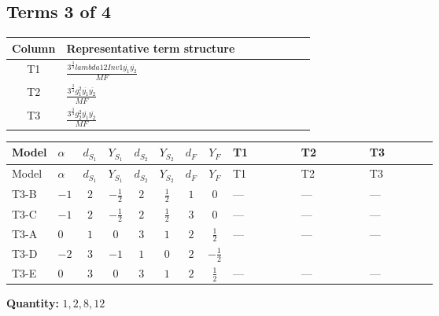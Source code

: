 \documentclass[8pt]{article}
\begin{document}
\begin{landscape}
\subsection*{Terms 3 of 4}
\begin{center}
\begin{tabular}{@{}c >{\raggedright\arraybackslash}p{0.82\linewidth}@{}}
\toprule
Column & Representative term structure \\
\midrule
T1 & \(\displaystyle \frac{3^{\frac{3}{4}} lambda12Inv1 \overline{y_{1}} \overline{y_{2}}}{MF}\) \\
\midrule
T2 & \(\displaystyle \frac{3^{\frac{3}{4}} g_{1}^{2} \overline{y_{1}} \overline{y_{2}}}{MF}\) \\
\midrule
T3 & \(\displaystyle \frac{3^{\frac{3}{4}} g_{2}^{2} \overline{y_{1}} \overline{y_{2}}}{MF}\) \\
\midrule
\bottomrule
\end{tabular}
\end{center}
\smallskip
\tiny
\begin{longtable}{@{}llcccccc >{\raggedright\arraybackslash}p{0.21\linewidth} >{\raggedright\arraybackslash}p{0.21\linewidth} >{\raggedright\arraybackslash}p{0.21\linewidth}@{}}
\toprule
Model & $\alpha$ & $d_{S_1}$ & $Y_{S_1}$ & $d_{S_2}$ & $Y_{S_2}$ & $d_F$ & $Y_F$ & T1 & T2 & T3 \\
\midrule
\endfirsthead
\toprule
Model & $\alpha$ & $d_{S_1}$ & $Y_{S_1}$ & $d_{S_2}$ & $Y_{S_2}$ & $d_F$ & $Y_F$ & T1 & T2 & T3 \\
\midrule
\endhead
T3-B & $-1$ & $2$ & $-\frac{1}{2}$ & $2$ & $\frac{1}{2}$ & $1$ & $0$ & --- & --- & --- \\
\midrule
T3-C & $-1$ & $2$ & $-\frac{1}{2}$ & $2$ & $\frac{1}{2}$ & $3$ & $0$ & --- & --- & --- \\
\midrule
T3-A & $0$ & $1$ & $0$ & $3$ & $1$ & $2$ & $\frac{1}{2}$ & --- & --- & --- \\
\midrule
T3-D & $-2$ & $3$ & $-1$ & $1$ & $0$ & $2$ & $-\frac{1}{2}$ & \scriptsize\adjustbox{max width=\linewidth}{$\begin{gathered} \frac{3^{\frac{3}{4}} lambda12Inv1 \overline{y_{1}} \overline{y_{2}}}{6 MF}\end{gathered}$} & \scriptsize\adjustbox{max width=\linewidth}{$\begin{gathered} \frac{3^{\frac{3}{4}} g_{1}^{2} \overline{y_{1}} \overline{y_{2}}}{8 MF}\end{gathered}$} & \scriptsize\adjustbox{max width=\linewidth}{$\begin{gathered} \frac{25 \cdot 3^{\frac{3}{4}} g_{2}^{2} \overline{y_{1}} \overline{y_{2}}}{24 MF}\end{gathered}$} \\
\midrule
T3-E & $0$ & $3$ & $0$ & $3$ & $1$ & $2$ & $\frac{1}{2}$ & --- & --- & --- \\
\midrule
\bottomrule
\end{longtable}
\clearpage
\noindent\textbf{Quantity: }$\mathrm{1,2,8,12}$\par\smallskip

\end{landscape}
\end{document}
